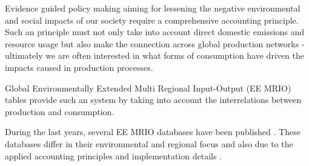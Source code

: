 Evidence guided policy making aiming for lessening the negative environmental and social impacts of our society require a comprehensive accounting principle. Such an principle must not only take into account direct domestic emissions and resource usage but also make the connection across global production networks - ultimately we are often interested in what forms of consumption have driven the impacts caused in production processes.

Global Environmentally Extended Multi Regional Input-Output (EE MRIO) tables provide such an system by taking into account the interrelations between production and consumption. 

During the last years, several EE MRIO databases have been published \cite{Tukker_2013}. These databases differ in their environmental and regional focus and also due to the applied accounting principles and implementation details \cite{Stadler_2014, Owen_2014, Moran_2014}. 
